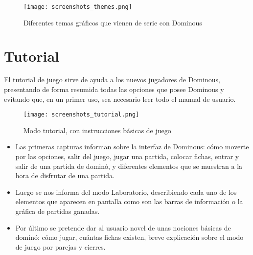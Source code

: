 \begin{figure}[h]
  \label{screenshots_themes}
  \begin{center}
    \texttt{[image: screenshots\_themes.png]}
  \end{center}
  \caption{Diferentes temas gráficos que vienen de serie con Dominous}
\end{figure}

\section{Tutorial}

El tutorial de juego sirve de ayuda a los nuevos jugadores de Dominous, presentando de forma resumida todas las opciones
que posee Dominous y evitando que, en un primer uso, sea necesario leer todo el manual de usuario.

\begin{figure}[h]
  \label{screenshots_tutorial}
  \begin{center}
    \texttt{[image: screenshots\_tutorial.png]}
  \end{center}
  \caption{Modo tutorial, con instrucciones básicas de juego}
\end{figure}

\begin{itemize}
    \item Las primeras capturas informan sobre la interfaz de Dominous: cómo moverte por las opciones, salir del juego, jugar
        una partida, colocar fichas, entrar y salir de una partida de dominó, y diferentes elementos que se muestran a la
        hora de disfrutar de una partida.
    \item Luego se nos informa del modo Laboratorio, describiendo cada uno de los elementos que aparecen en pantalla como
        son las barras de información o la gráfica de partidas ganadas.
    \item Por último se pretende dar al usuario novel de unas nociones básicas de dominó: cómo jugar, cuántas fichas existen,
        breve explicación sobre el modo de juego por parejas y cierres.
\end{itemize}


